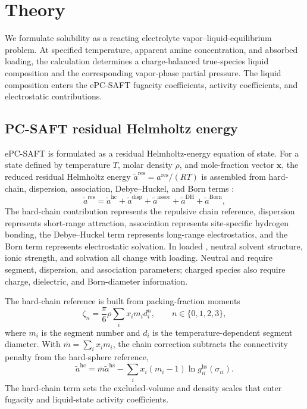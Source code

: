 \section{Theory}\label{sec:theory}
We formulate \COtwo solubility as a reacting electrolyte vapor--liquid-equilibrium problem.  At specified temperature, apparent amine concentration, and absorbed \COtwo loading, the calculation determines a charge-balanced true-species liquid composition and the corresponding vapor-phase \COtwo partial pressure.  The liquid composition enters the ePC-SAFT fugacity coefficients, activity coefficients, and electrostatic contributions.

\subsection{PC-SAFT residual Helmholtz energy}
ePC-SAFT is formulated as a residual Helmholtz-energy equation of state.  For a state defined by temperature \(T\), molar density \(\rho\), and mole-fraction vector \(\boldsymbol{x}\), the reduced residual Helmholtz energy \(\tilde{a}^{\mathrm{res}}=a^{\mathrm{res}}/(RT)\) is assembled from hard-chain, dispersion, association, Debye--Huckel, and Born terms \cite{Gross2001,Gross2002,Cameretti2005,Bulow2021a,Figiel2025}:
\begin{equation}
    \tilde{a}^{\mathrm{res}}
    =
    \tilde{a}^{\mathrm{hc}}
    +\tilde{a}^{\mathrm{disp}}
    +\tilde{a}^{\mathrm{assoc}}
    +\tilde{a}^{\mathrm{DH}}
    +\tilde{a}^{\mathrm{Born}} ,
    \label{eq:epcsaft-residual-split}
\end{equation}
The hard-chain contribution represents the repulsive chain reference, dispersion represents short-range attraction, association represents site-specific hydrogen bonding, the Debye--Huckel term represents long-range electrostatics, and the Born term represents electrostatic solvation.  In loaded \MEA, neutral solvent structure, ionic strength, and solvation all change with \COtwo loading.  Neutral \MEA and \HtwoO require segment, dispersion, and association parameters; charged species also require charge, dielectric, and Born-diameter information.

The hard-chain reference is built from packing-fraction moments
\begin{equation}
    \zeta_n=\frac{\pi}{6}\rho\sum_i x_i m_i d_i^n,\qquad n\in\{0,1,2,3\},
    \label{eq:epcsaft-zeta-moments}
\end{equation}
where \(m_i\) is the segment number and \(d_i\) is the temperature-dependent segment diameter.  With \(\bar{m}=\sum_i x_i m_i\), the chain correction subtracts the connectivity penalty from the hard-sphere reference,
\begin{equation}
    \tilde{a}^{\mathrm{hc}}
    =
    \bar{m}\tilde{a}^{\mathrm{hs}}
    -
    \sum_i x_i(m_i-1)\ln g_{ii}^{\mathrm{hs}}(\sigma_{ii}) .
    \label{eq:epcsaft-hard-chain}
\end{equation}
The hard-chain term sets the excluded-volume and density scales that enter fugacity and liquid-state activity coefficients.

